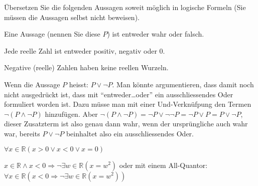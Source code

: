 Übersetzen Sie die folgenden Aussagen soweit möglich in
logische Formeln (Sie müssen die Aussagen selbst nicht beweisen).
\begin{teilaufgaben}
\item Eine Aussage (nennen Sie diese $P$) ist entweder wahr oder falsch.
\item Jede reelle Zahl ist entweder positiv, negativ oder $0$.
\item Negative (reelle) Zahlen haben keine reellen Wurzeln.
\end{teilaufgaben}


\begin{loesung}
\begin{teilaufgaben}
\item Wenn die Aussage $P$ heisst: $P\vee\neg P$.
Man könnte argumentieren, dass damit noch nicht ausgedrückt ist,
dass mit ``entweder\dots oder'' ein ausschliessendes Oder formuliert
worden ist. Dazu müsse man mit einer Und-Verknüfpung den Termen
$\neg(P\wedge \neg P)$
hinzufügen. Aber
$\neg(P\wedge \neg P)=\neg P\vee \neg\neg P=\neg P\vee P=P\vee\neg P$,
dieser Zusatzterm ist also genau dann wahr, wenn der ursprüngliche
auch wahr war, bereits $P\vee \neg P$ beinhaltet also ein ausschliessendes
Oder.
\item $\forall x\in\mathbb R(x > 0\vee x<0\vee x=0)$
\item $x\in\mathbb R\wedge x < 0\Rightarrow
\neg\exists w\in\mathbb R(x=w^2)$
oder mit einem All-Quantor: $\forall x\in\mathbb R(x<0\Rightarrow
\neg\exists w\in\mathbb R(x=w^2))$
\qedhere
\end{teilaufgaben}
\end{loesung}

